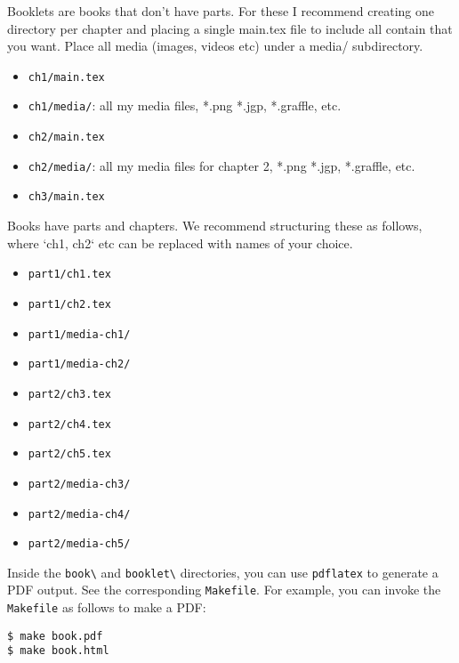 \begin{gram}[Booklets]
 
 Booklets are books that don't have parts. For these  I recommend creating one directory per chapter and placing a single main.tex file to include all contain that you want.  Place all media (images, videos etc) under a media/ subdirectory. 
\begin{itemize}  
\item \lstinline`ch1/main.tex`
\item \lstinline`ch1/media/`: all my media files, *.png *.jgp, *.graffle, etc.
\item \lstinline`ch2/main.tex`
\item \lstinline`ch2/media/`: all my media files for chapter 2, *.png *.jgp, *.graffle, etc.
\item \lstinline`ch3/main.tex`
\end{itemize}
\end{gram}

\begin{gram}[Books]

Books have parts and chapters. We recommend structuring these as follows, where `ch1, ch2` etc can be replaced with names of your choice.
%
\begin{itemize}
\item \lstinline`part1/ch1.tex`
\item \lstinline`part1/ch2.tex`
\item \lstinline`part1/media-ch1/`
\item \lstinline`part1/media-ch2/`
\item \lstinline`part2/ch3.tex`
\item \lstinline`part2/ch4.tex`
\item \lstinline`part2/ch5.tex`
\item \lstinline`part2/media-ch3/`
\item \lstinline`part2/media-ch4/`
\item \lstinline`part2/media-ch5/`
\end{itemize}
   
\end{gram}


\begin{gram}
Inside the \lstinline`book\` and \lstinline`booklet\` directories, 
you can use \lstinline`pdflatex` to generate a PDF output.  See the corresponding \lstinline`Makefile`.
%
For example, you can  invoke the \lstinline`Makefile` as follows to make a PDF:
\begin{lstlisting}
$ make book.pdf
$ make book.html
\end{lstlisting}
\end{gram}


